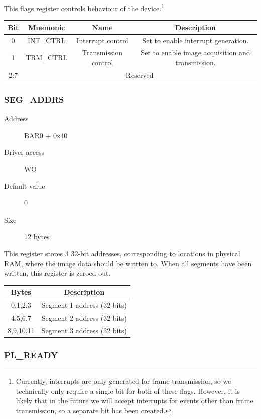 \documentclass[12pt]{article}
\begin{document}
This flags register controls behaviour of the device.\footnote{Currently, interrupts are only generated for frame transmission, so we technically only require a single bit for both of these flags. However, it is likely that in the future we will accept interrupts for events other than frame transmission, so a separate bit has been created.}

\begin{tabular}{|c|c|c|c|}\hline
\textbf{Bit} & \textbf{Mnemonic} & \textbf{Name} & \textbf{Description} \\ \hline
0 & INT\_CTRL & Interrupt control & Set to enable interrupt generation. \\ \hline
1 & TRM\_CTRL & Transmission control & Set to enable image acquisition and transmission. \\ \hline
2:7 & \multicolumn{3}{|c|}{Reserved} \\ \hline
\end{tabular}

\subsubsection{SEG\_ADDRS}

\begin{description}
\item[Address] BAR0 + 0x40
\item[Driver access] WO
\item[Default value] 0
\item[Size] 12 bytes
\end{description}

This register stores 3 32-bit addresses, corresponding to locations in physical RAM, where the image data should be written to. When all segments have been written, this register is zeroed out.

\begin{tabular}{|c|c|}\hline
\textbf{Bytes} & \textbf{Description} \\ \hline
0,1,2,3 & Segment 1 address (32 bits) \\ \hline
4,5,6,7 & Segment 2 address (32 bits) \\ \hline
8,9,10,11 & Segment 3 address (32 bits) \\ \hline
\end{tabular}

\subsubsection{PL\_READY}
\end{document}

